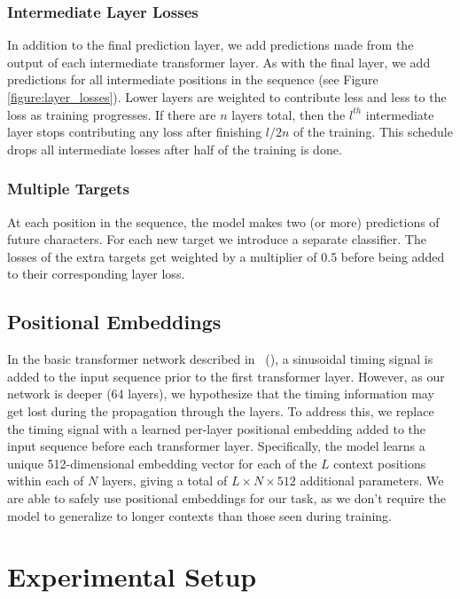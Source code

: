 \subsubsection{Intermediate Layer Losses}
\label{section:intermediate_layer_losses}

In addition to the final prediction layer, we add predictions made from the output of each intermediate transformer layer. As with the final layer, we add predictions for all intermediate positions in the sequence (see Figure \ref{figure:layer_losses}).
Lower layers are weighted to contribute less and less to the loss as training progresses. If there are $n$ layers total, then the $l^{th}$ intermediate layer stops contributing any loss after finishing $l/2n$ of the training. This schedule drops all intermediate losses after half of the training is done.

\subsubsection{Multiple Targets}

At each position in the sequence, the model makes two (or more) predictions of future characters. For each new target we introduce a separate classifier. The losses of the extra targets get weighted by a multiplier of 0.5 before being added to their corresponding layer loss.

\subsection{Positional Embeddings}
\label{section:positional}
In the basic transformer network described in \citeauthor{NIPS2017_7181}~(\citeyear{NIPS2017_7181}), a sinusoidal timing signal is added to the input sequence prior to the first transformer layer. However, as our network is deeper (64 layers), we hypothesize that the timing information may get lost during the propagation through the layers. To address this, we replace the timing signal with a learned per-layer positional embedding added to the input sequence before each transformer layer. Specifically, the model learns a unique 512-dimensional embedding vector for each of the $L$ context positions within each of $N$ layers, giving a total of $L \times N \times 512$ additional parameters. We are able to safely use positional embeddings for our task, as we don't require the model to generalize to longer contexts than those seen during training.

\section{Experimental Setup}
